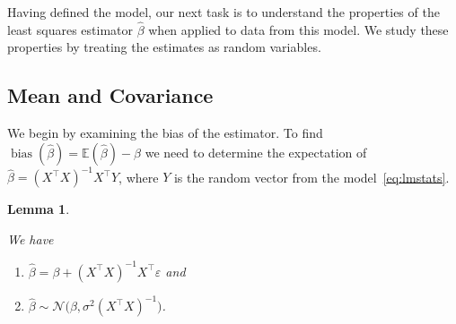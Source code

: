 \documentclass[
  a4paper,
]{article}
\newtheorem{lemma}{Lemma}[section]
\theoremstyle{definition}
\theoremstyle{definition}
\theoremstyle{definition}
\theoremstyle{definition}
\theoremstyle{remark}
\begin{document}
Having defined the model, our next task is to understand the properties of
the least squares estimator \(\hat\beta\) when applied to data from this model.
We study these properties by treating the estimates as random variables.

\subsection{Mean and Covariance}\label{mean-and-covariance}

We begin by examining the bias of the estimator. To find \(\mathop{\mathrm{bias}}(\hat\beta) =
\mathbb{E}(\hat\beta) - \beta\) we need to determine the expectation of \(\hat\beta =
(X^\top X)^{-1} X^\top Y\), where \(Y\) is the random vector from
the model~\eqref{eq:lmstats}.

\begin{lemma}
\protect\hypertarget{lem:hat-beta-dist}{}\label{lem:hat-beta-dist}

We have

\begin{enumerate}
\def\labelenumi{\arabic{enumi})}
\item
  \(\hat\beta = \beta + (X^\top X)^{-1} X^\top \varepsilon\) and
\item
  \(\hat\beta \sim \mathcal{N}\bigl( \beta, \sigma^2 (X^\top X)^{-1} \bigr)\).
\end{enumerate}

\end{lemma}
\end{document}
